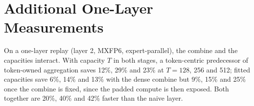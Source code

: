 \section{Additional One-Layer Measurements}
\label{app:layer}

On a one-layer replay (layer 2, MXFP6, expert-parallel), the combine and the capacities interact. With capacity $T$ in
both stages, a token-centric predecessor of token-owned aggregation saves 12\%, 29\% and 23\% at $T=128$, 256 and 512;
fitted capacities save 6\%, 14\% and 13\% with the dense combine but 9\%, 15\% and 25\% once the combine is fixed, since
the padded compute is then exposed. Both together are 20\%, 40\% and 42\% faster than the naive layer.
